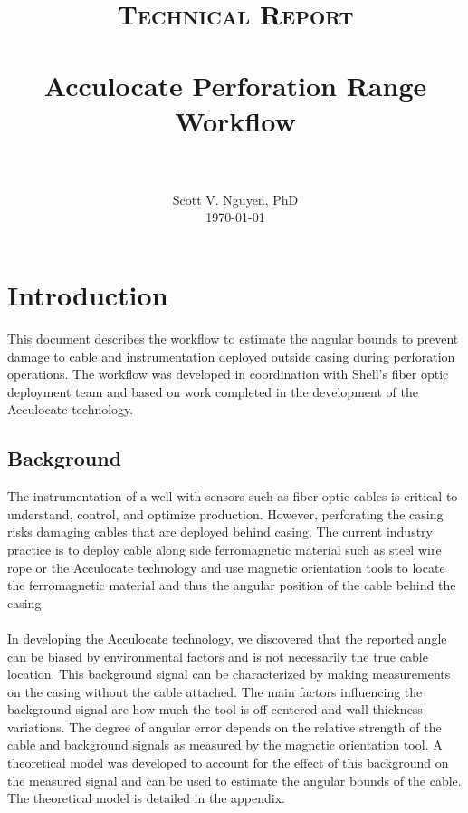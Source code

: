 \documentclass[paper=a4, fontsize=11pt]{scrartcl}
\title{
		\usefont{OT1}{bch}{b}{n}
		\normalfont \normalsize \textsc{Technical Report} \\ [25pt]
		\horrule{0.5pt} \\[0.4cm]
		\huge Acculocate Perforation Range Workflow \\
		\horrule{2pt} \\[0.5cm]
}
\author{
		\normalfont 								\normalsize
        Scott V. Nguyen, PhD\\[-3pt]		\normalsize
        \today
}
\date{}
\numberwithin{equation}{section}		%
\numberwithin{figure}{section}			%
\numberwithin{table}{section}				%
\begin{document}
\maketitle
\section{Introduction}
This document describes the workflow to estimate the angular bounds to prevent damage to cable and instrumentation deployed outside casing during perforation operations.  The workflow was developed in coordination with Shell's fiber optic deployment team and based on work completed in the development of the Acculocate technology.  

\subsection{Background}
The instrumentation of a well with sensors such as fiber optic cables is critical to understand, control, and optimize production.  However, perforating the casing risks damaging cables that are deployed behind casing.  The current industry practice is to deploy cable along side ferromagnetic material such as steel wire rope or the Acculocate technology and use magnetic orientation tools to locate the ferromagnetic material and thus the angular position of the cable behind the casing.  

\paragraph{}
In developing the Acculocate technology, we discovered that the reported angle can be biased by environmental factors and is not necessarily the true cable location.  This background signal can be characterized by making measurements on the casing without the cable attached.  The main factors influencing the background signal are how much the tool is off-centered and wall thickness variations.  The degree of angular error depends on the relative strength of the cable and background signals as measured by the magnetic orientation tool.  A theoretical model was developed to account for the effect of this background on the measured signal and can be used to estimate the angular bounds of the cable.  The theoretical model is detailed in the appendix.
\end{document}
